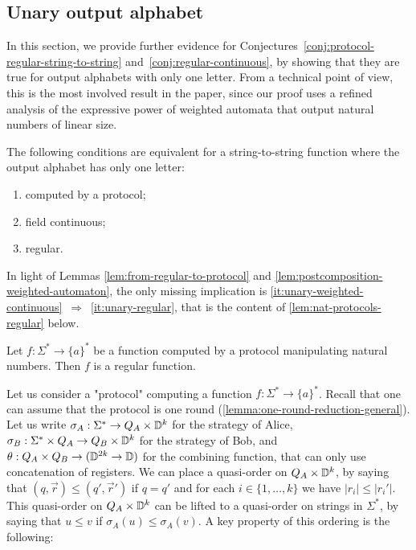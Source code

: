\subsection{Unary output alphabet}
\label{sec:unary-output-alphabet}

In this section, we provide further evidence for
Conjectures~\ref{conj:protocol-regular-string-to-string}
and~\ref{conj:regular-continuous}, by showing that they are true for output
alphabets with only one letter. From a technical point of view, this is the
most involved result in the paper, since our proof uses a refined analysis of
the expressive power of weighted automata that output natural numbers of linear
size.

\begin{theorem}\label{thm:unary-string-to-string}
    The following conditions are equivalent for  a string-to-string function where  the output alphabet  has only one letter:
    \begin{enumerate}
        \item computed by a protocol;
        \item \label{it:unary-weighted-continuous} field continuous;
        \item \label{it:unary-regular} regular.
    \end{enumerate}
\end{theorem}

In light of Lemmas \ref{lem:from-regular-to-protocol} and
\ref{lem:postcomposition-weighted-automaton}, the only missing implication is
\ref{it:unary-weighted-continuous}~$\Rightarrow$~\ref{it:unary-regular},
that is the content of \cref{lem:nat-protocols-regular} below.


\begin{lemma}
  \label{lem:nat-protocols-regular}
  Let $f : \Sigma^* \to \{a\}^*$ be a function computed by a protocol
  manipulating natural numbers. Then $f$ is a regular function.
\end{lemma}


Let us consider a "protocol" computing a function $f : \Sigma^* \to \{a\}^*$.
Recall that one can assume that the protocol is one round
(\cref{lemma:one-round-reduction-general}). Let us write $\sigma_A : \Sigma^*
\to Q_A \times \mathbb D^k$ for the strategy of Alice, $\sigma_B : \Sigma^*
\times Q_A \to Q_B \times \mathbb D^k$ for the strategy of Bob, and $\theta : Q_A
\times Q_B \to (\mathbb D^{2k} \to \mathbb D)$ for the combining function, that can
only use concatenation of registers.
We can place a quasi-order on $Q_A \times \mathbb D^k$, by saying that $(q,
\vec{r}) \leq (q', \vec{r}')$ if $q = q'$ and for each $i \in \{1, \ldots, k\}$
we have $|r_i|\leq |r_i'|$. This quasi-order on $Q_A \times
\mathbb D^k$ can be lifted to a quasi-order on strings in $\Sigma^*$, by saying
that $u \leq v$ if $\sigma_A(u) \leq \sigma_A(v)$. A key property of 
this ordering is the following:

